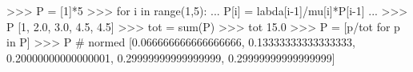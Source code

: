 
>>> P = [1]*5
>>> for i in range(1,5):
...     P[i] = labda[i-1]/mu[i]*P[i-1]
...
>>> P
[1, 2.0, 3.0, 4.5, 4.5]
>>> tot = sum(P)
>>> tot
15.0
>>> P = [p/tot for p in P]
>>> P # normed
[0.066666666666666666, 0.13333333333333333, 0.20000000000000001,
0.29999999999999999, 0.29999999999999999]

